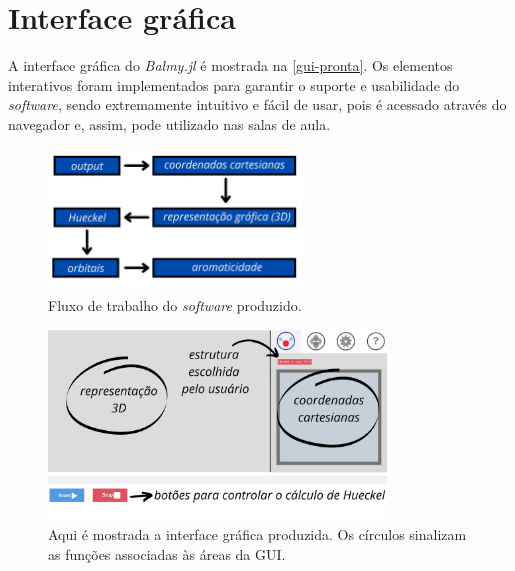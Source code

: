 \section{Interface gráfica}\label{design}

A interface gráfica do \textit{Balmy.jl} é mostrada na \autoref{gui-pronta}. Os elementos interativos foram implementados para garantir o suporte e usabilidade do \textit{software}, sendo extremamente intuitivo e fácil de usar, pois é acessado através do navegador e, assim, pode utilizado nas salas de aula.

\begin{figure}[htb]
	\caption{\label{workflow} Fluxo de trabalho do \textit{software} produzido.}
	\begin{center}
		\includegraphics[width=0.6\textwidth]{images/workflow.png}
	\end{center}
\end{figure}

\begin{figure}[htb]
	\caption{\label{gui-pronta} Aqui é mostrada a interface gráfica produzida. Os círculos sinalizam as funções associadas às áreas da \gls{GUI}.}
	\begin{center}
		\includegraphics[width=0.8\textwidth]{images/GUI-EXAMPLE.png}
	\end{center}
\end{figure}

